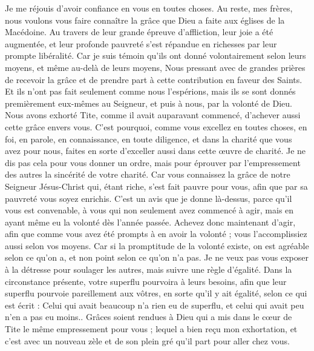 \begin{multicols}{2}
Je me réjouis d'avoir confiance en vous en toutes choses.
\VerseOne{}Au reste, mes frères, nous voulons vous faire connaître la grâce que Dieu a faite aux églises de la Macédoine.
Au travers de leur grande épreuve d'affliction, leur joie a été augmentée, et leur profonde pauvreté s'est répandue en richesses par leur prompte libéralité.
Car je suis témoin qu'ils ont donné volontairement selon leurs moyens, et même au-delà de leurs moyens,
Nous pressant avec de grandes prières de recevoir la grâce et de prendre part à cette contribution en faveur des Saints.
Et ils n'ont pas fait seulement comme nous l'espérions, mais ils se sont donnés premièrement eux-mêmes au Seigneur, et puis à nous, par la volonté de Dieu.
Nous avons exhorté Tite, comme il avait auparavant commencé, d'achever aussi cette grâce envers vous.
C'est pourquoi, comme vous excellez en toutes choses, en foi, en parole, en connaissance, en toute diligence, et dans la charité que vous avez pour nous, faites en sorte d’exceller aussi dans cette œuvre de charité.
Je ne dis pas cela pour vous donner un ordre, mais pour éprouver par l’empressement des autres la sincérité de votre charité.
Car vous connaissez la grâce de notre Seigneur Jésus-Christ qui, étant riche, s'est fait pauvre pour vous, afin que par sa pauvreté vous soyez enrichis.
C’est un avis que je donne là-dessus, parce qu'il vous est convenable, à vous qui non seulement avez commencé à agir, mais en ayant même eu la volonté dès l'année passée.
Achevez donc maintenant d'agir, afin que comme vous avez été prompts à en avoir la volonté ; vous l'accomplissiez aussi selon vos moyens.
Car si la promptitude de la volonté existe,  on est agréable selon ce qu'on a, et non point selon ce qu'on n'a pas.
Je ne veux pas vous exposer à la détresse pour soulager les autres, mais suivre une règle d’égalité. Dans la circonstance présente, votre superflu pourvoira à leurs besoins,
afin que leur superflu pourvoie pareillement aux vôtres, en sorte qu’il y ait égalité,
selon ce qui est écrit : Celui qui avait beaucoup n'a rien eu de superflu, et celui qui avait peu n'en a pas eu moins..
Grâces soient rendues à Dieu qui a mis dans le cœur de Tite le même empressement pour vous ;
lequel a bien reçu mon exhortation, et c'est avec un nouveau zèle et de son plein gré qu'il part pour aller chez vous.

\end{multicols}
